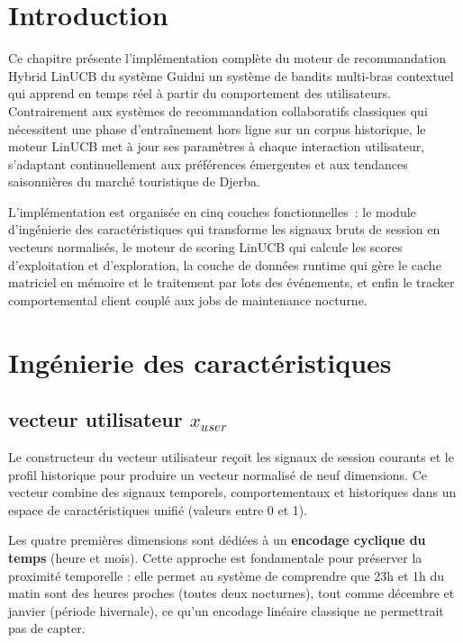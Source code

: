 
\section{Introduction}

Ce chapitre présente l'implémentation complète du moteur de recommandation Hybrid LinUCB du
système Guidni   un système de bandits multi-bras contextuel qui apprend en temps réel à
partir du comportement des utilisateurs. Contrairement aux systèmes de recommandation
collaboratifs classiques qui nécessitent une phase d'entraînement hors ligne sur un corpus
historique, le moteur LinUCB met à jour ses paramètres à chaque interaction utilisateur,
s'adaptant continuellement aux préférences émergentes et aux tendances saisonnières du marché
touristique de Djerba.

L'implémentation est organisée en cinq couches fonctionnelles~: le module d'ingénierie des
caractéristiques qui transforme les signaux bruts de session en vecteurs normalisés, le moteur
de scoring LinUCB qui calcule les scores d'exploitation et d'exploration, la couche de
données runtime qui gère le cache matriciel en mémoire et le traitement par lots des
événements, et enfin le tracker comportemental client couplé aux jobs de maintenance nocturne.


\section{Ingénierie des caractéristiques}

\subsection{vecteur utilisateur $x_{user}$}

Le constructeur du vecteur utilisateur reçoit les signaux de session courants et le profil historique pour produire un vecteur normalisé de neuf dimensions. Ce vecteur combine des signaux temporels, comportementaux et historiques dans un espace de caractéristiques unifié (valeurs entre 0 et 1).

Les quatre premières dimensions sont dédiées à un \textbf{encodage cyclique du temps} (heure et mois). Cette approche est fondamentale pour préserver la proximité temporelle : elle permet au système de comprendre que 23h et 1h du matin sont des heures proches (toutes deux nocturnes), tout comme décembre et janvier (période hivernale), ce qu'un encodage linéaire classique ne permettrait pas de capter.

